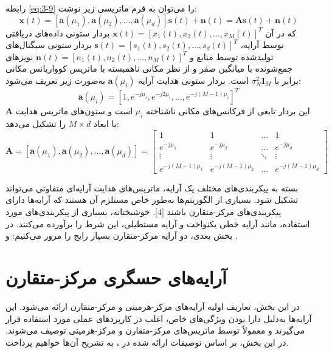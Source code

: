 رابطه \eqref{eq:3-9} را می‌توان به فرم ماتریسی زیر نوشت:
\begin{equation}
	\bm{x}(t) = [\bm{a}(\mu_1), \bm{a}(\mu_2), \dots, \bm{a}(\mu_d)] \bm{s}(t) + \bm{n}(t) = \bm{A}\bm{s}(t) + \bm{n}(t)
	\label{eq:3-10}
\end{equation}
که در آن $\bm{x}(t) = [x_1(t), x_2(t), \dots, x_M(t)]^T$ بردار ستونی داده‌های دریافتی توسط آرایه، $\bm{s}(t) = [s_1(t), s_2(t), \dots, s_d(t)]^T$ بردار ستونی سیگنال‌های تولیدشده توسط منابع و $\bm{n}(t) = [n_1(t), n_2(t), \dots, n_M(t)]^T$ نویزهای جمع‌شونده با میانگین صفر و از نظر مکانی ناهمبسته با ماتریس کوواریانس مکانی برابر با $\sigma_N^2 \bm{I}_M$ است. بردار ستونی هدایت آرایه $\bm{a}(\mu_i)$ به‌صورت زیر تعریف می‌شود:
\begin{equation}
	\bm{a}(\mu_i) = [1, e^{-j\mu_i}, e^{-j2\mu_i}, \dots, e^{-j(M-1)\mu_i}]^T
	\label{eq:3-11}
\end{equation}
این بردار تابعی از فرکانس‌های مکانی ناشناخته $\mu_i$ است و ستون‌های ماتریس هدایت $\bm{A}$ با ابعاد $M \times d$ را تشکیل می‌دهد:
\begin{equation}
	\bm{A} = [\bm{a}(\mu_1), \bm{a}(\mu_2), \dots, \bm{a}(\mu_d)] = 
	\begin{bmatrix} 
		1 & 1 & \dots & 1 \\
		e^{-j\mu_1} & e^{-j\mu_2} & \dots & e^{-j\mu_d} \\
		\vdots & \vdots & \ddots & \vdots \\
		e^{-j(M-1)\mu_1} & e^{-j(M-1)\mu_2} & \dots & e^{-j(M-1)\mu_d}
	\end{bmatrix}
	\label{eq:3-12}
\end{equation}

بسته به پیکربندی‌های مختلف یک آرایه، ماتریس‌های هدایت آرایه‌ای متفاوتی می‌تواند تشکیل شود. بسیاری از الگوریتم‌ها به‌طور خاص مستلزم آن هستند که آرایه‌ها دارای پیکربندی‌های مرکز-متقارن باشند [4]. خوشبختانه، بسیاری از پیکربندی‌های مورد استفاده، مانند آرایه خطی یکنواخت و آرایه مستطیلی، این شرط را برآورده می‌کنند. در بخش بعدی، دو آرایه مرکز-متقارن بسیار رایج را مرور می‌کنیم:  و .





\section{آرایه‌های حسگری مرکز-متقارن}
\label{sec:3-3}

در این بخش، تعاریف اولیه آرایه‌های مرکز-هرمیتی و مرکز-متقارن ارائه می‌شود. این آرایه‌ها به‌دلیل دارا بودن ویژگی‌های خاص، اغلب در کاربردهای عملی مورد استفاده قرار می‌گیرند و معمولاً توسط ماتریس‌های مرکز-متقارن و مرکز-هرمیتی توصیف می‌شوند. در این بخش، بر اساس توصیفات ارائه شده در \cite{1, 5}، به تشریح آن‌ها خواهیم پرداخت.

